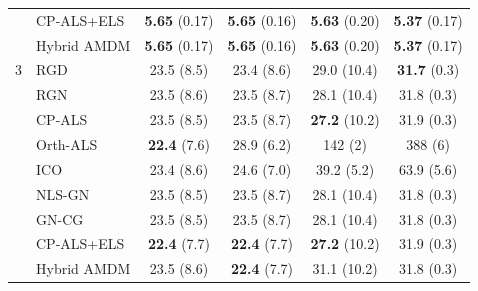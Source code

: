 \begin{table}[!htbp]
{\begin{tabular}{llcccc}
 & CP-ALS+ELS & \textbf{5.65} (0.17) & \textbf{5.65} (0.16) & \textbf{5.63} (0.20) & \textbf{5.37} (0.17) \\
 & Hybrid AMDM & \textbf{5.65} (0.17) & \textbf{5.65} (0.16) & \textbf{5.63} (0.20) & \textbf{5.37} (0.17) \\
\midrule
3 & RGD & 23.5 (8.5) & 23.4 (8.6) & 29.0 (10.4) & \textbf{31.7} (0.3) \\
 & RGN & 23.5 (8.6) & 23.5 (8.7) & 28.1 (10.4) & 31.8 (0.3) \\
 & CP-ALS & 23.5 (8.5) & 23.5 (8.7) & \textbf{27.2} (10.2) & 31.9 (0.3) \\
 & Orth-ALS & \textbf{22.4} (7.6) & 28.9 (6.2) & 142 (2) & 388 (6) \\
 & ICO & 23.4 (8.6) & 24.6 (7.0) & 39.2 (5.2) & 63.9 (5.6) \\
 & NLS-GN & 23.5 (8.5) & 23.5 (8.7) & 28.1 (10.4) & 31.8 (0.3) \\
 & GN-CG & 23.5 (8.5) & 23.5 (8.7) & 28.1 (10.4) & 31.8 (0.3) \\
 & CP-ALS+ELS & \textbf{22.4} (7.7) & \textbf{22.4} (7.7) & \textbf{27.2} (10.2) & 31.9 (0.3) \\
 & Hybrid AMDM & 23.5 (8.6) & \textbf{22.4} (7.7) & 31.1 (10.2) & 31.8 (0.3) \\
\bottomrule
\end{tabular}}
\end{table}
